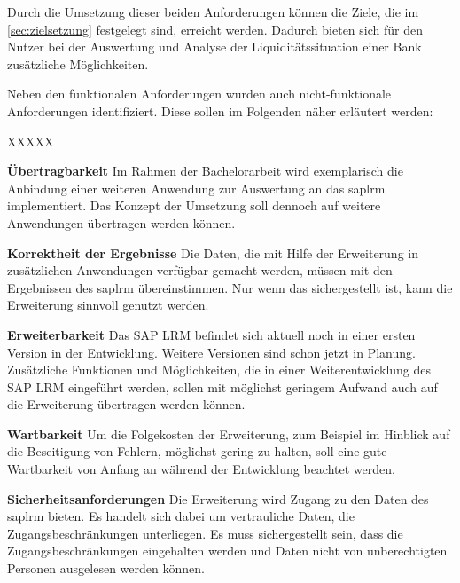 \begin{onehalfspacing}
Durch die Umsetzung dieser beiden Anforderungen können die Ziele, die im \vref{sec:zielsetzung} festgelegt sind, erreicht werden. Dadurch bieten sich für den Nutzer bei der Auswertung und Analyse der Liquiditätssituation einer Bank zusätzliche Möglichkeiten.

Neben den funktionalen Anforderungen wurden auch nicht-funktionale Anforderungen identifiziert. Diese sollen im Folgenden näher erläutert werden:

\begin{seToplist}{ XXXXX }

\item[\anfl{uebertragbarkeit}] \textbf{Übertragbarkeit} \newline
Im Rahmen der Bachelorarbeit wird exemplarisch die Anbindung einer weiteren Anwendung zur Auswertung an das \gls{saplrm} implementiert. Das Konzept der Umsetzung soll dennoch auf weitere Anwendungen übertragen werden können.

\item[\anfl{korrektheit}] \textbf{Korrektheit der Ergebnisse} \newline
Die Daten, die mit Hilfe der Erweiterung in zusätzlichen Anwendungen verfügbar gemacht werden, müssen mit den Ergebnissen des \gls{saplrm} übereinstimmen. Nur wenn das sichergestellt ist, kann die Erweiterung sinnvoll genutzt werden.

\item[\anfl{erweiterbarkeit}] \textbf{Erweiterbarkeit} \newline
Das SAP LRM befindet sich aktuell noch in einer ersten Version in der Entwicklung. Weitere Versionen sind schon jetzt in Planung. Zusätzliche Funktionen und Möglichkeiten, die in einer Weiterentwicklung des SAP LRM eingeführt werden, sollen mit möglichst geringem Aufwand auch auf die Erweiterung übertragen werden können.

\item[\anfl{wartbarkeit}] \textbf{Wartbarkeit} \newline
Um die Folgekosten der Erweiterung, zum Beispiel im Hinblick auf die Beseitigung von Fehlern, möglichst gering zu halten, soll eine gute Wartbarkeit von Anfang an während der Entwicklung beachtet werden.

\item[\anfl{sicherheit}] \textbf{Sicherheitsanforderungen} \newline
Die Erweiterung wird Zugang zu den Daten des \gls{saplrm} bieten. Es handelt sich dabei um vertrauliche Daten, die Zugangsbeschränkungen unterliegen. Es muss sichergestellt sein, dass die Zugangsbeschränkungen eingehalten werden und Daten nicht von unberechtigten Personen ausgelesen werden können.


\end{seToplist}
\end{onehalfspacing}
